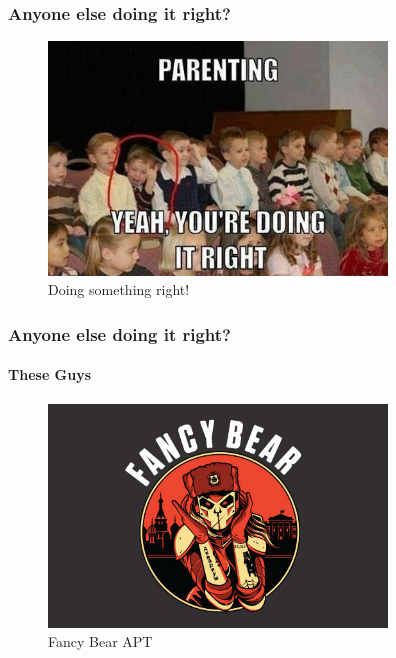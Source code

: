 \documentclass[aspectratio=169]{beamer}
\begin{document}
\begin{frame}
  \frametitle{Anyone else doing it right?}
  \begin{center}
    \begin{figure}
      \includegraphics[width=9cm,keepaspectratio]{doing_it_right}
      \caption{Doing something right!}
    \end{figure}
  \end{center}
\end{frame}

\begin{frame}
  \frametitle{Anyone else doing it right?}
  \framesubtitle{These Guys}
  \begin{center}
    \begin{figure}
      \includegraphics[width=9cm,keepaspectratio]{fancy_bear}
      \caption{Fancy Bear APT}
    \end{figure}
  \end{center}
\end{frame}
\end{document}
